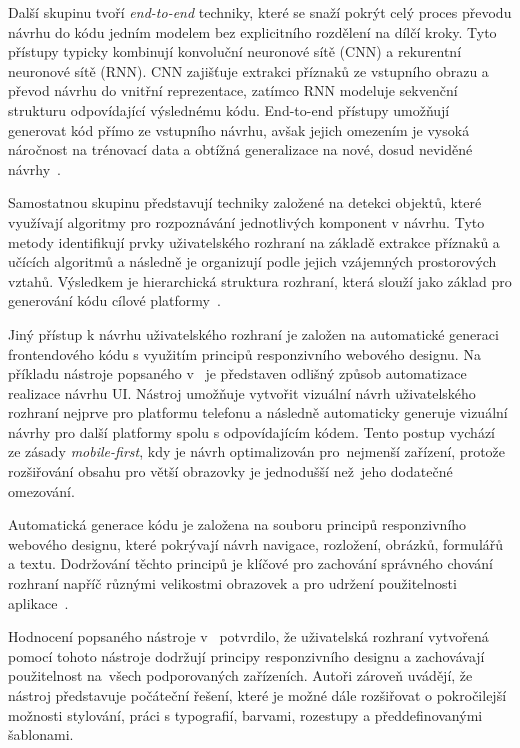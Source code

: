 Další skupinu tvoří \textit{end-to-end} techniky, které se snaží pokrýt celý proces převodu návrhu do kódu jedním modelem bez explicitního rozdělení na dílčí kroky. Tyto přístupy typicky kombinují konvoluční neuronové sítě (CNN) a rekurentní neuronové sítě (RNN). CNN zajišťuje extrakci příznaků ze vstupního obrazu a převod návrhu do vnitřní reprezentace, zatímco RNN modeluje sekvenční strukturu odpovídající výslednému kódu. End-to-end přístupy umožňují generovat kód přímo ze vstupního návrhu, avšak jejich omezením je vysoká náročnost na trénovací data a obtížná generalizace na nové, dosud neviděné návrhy~\cite{GeneratedDesign}.

Samostatnou skupinu představují techniky založené na detekci objektů, které využívají algoritmy pro rozpoznávání jednotlivých komponent v návrhu. Tyto metody identifikují prvky uživatelského rozhraní na základě extrakce příznaků a učících algoritmů a následně je organizují podle jejich vzájemných prostorových vztahů. Výsledkem je hierarchická struktura rozhraní, která slouží jako základ pro generování kódu cílové platformy~\cite{GeneratedDesign}.

Jiný přístup k návrhu uživatelského rozhraní je založen na automatické generaci frontendového kódu s využitím principů responzivního webového designu. Na příkladu nástroje popsaného v~\cite{MobileFirst} je představen odlišný způsob automatizace realizace návrhu UI. Nástroj umožňuje vytvořit vizuální návrh uživatelského rozhraní nejprve pro platformu telefonu a následně automaticky generuje vizuální návrhy pro další platformy spolu s odpovídajícím kódem. Tento postup vychází ze zásady \textit{mobile-first}, kdy je návrh optimalizován pro~nejmenší zařízení, protože rozšiřování obsahu pro větší obrazovky je jednodušší než~jeho dodatečné omezování.

Automatická generace kódu je založena na souboru principů responzivního webového designu, které pokrývají návrh navigace, rozložení, obrázků, formulářů a textu. Dodržování těchto principů je klíčové pro zachování správného chování rozhraní napříč různými velikostmi obrazovek a pro udržení použitelnosti aplikace~\cite{MobileFirst}.

Hodnocení popsaného nástroje v~\cite{MobileFirst} potvrdilo, že uživatelská rozhraní vytvořená pomocí tohoto nástroje dodržují principy responzivního designu a zachovávají použitelnost na~všech podporovaných zařízeních. Autoři zároveň uvádějí, že nástroj představuje počáteční řešení, které je možné dále rozšiřovat o pokročilejší možnosti stylování, práci s typografií, barvami, rozestupy a předdefinovanými šablonami.

